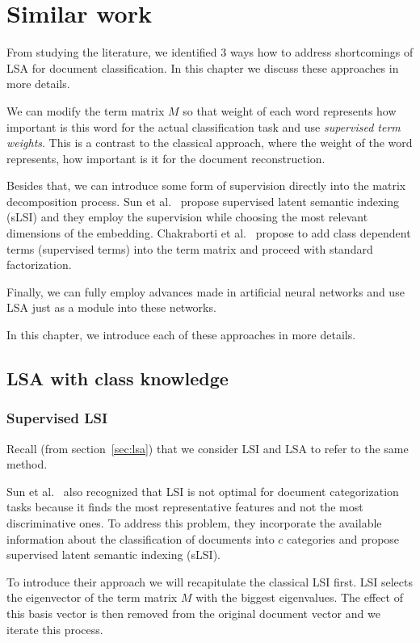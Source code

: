 \chapter{Similar work}
From studying the literature, we identified 3 ways how to address shortcomings of LSA for document classification. In this chapter we discuss these approaches in more details.

We can modify the term matrix $M$ so that weight of each word represents how important is this word for the actual classification task and use \emph{supervised term weights}. 
This is a contrast to the classical approach, where the weight of the word represents, how important is it for the document reconstruction.

Besides that, we can introduce some form of supervision directly into the matrix decomposition process.
Sun et al.~\cite{sun2004supervised} propose supervised latent semantic indexing (sLSI) and they employ the supervision while choosing the most relevant dimensions of the embedding.
Chakraborti et al.~\cite{chakraborti2006sprinkling} propose to add class dependent terms (supervised terms) into the term matrix and proceed with standard factorization.

Finally, we can fully employ advances made in artificial neural networks and use LSA just as a module into these networks.

In this chapter, we introduce each of these approaches in more details.


\section{LSA with class knowledge} \label{sec:superwisedlsa}
    \subsection{Supervised LSI}
        Recall (from section~\ref{sec:lsa}) that we consider LSI and LSA to refer to the same method. 
    
        Sun et al.~\cite{sun2004supervised} %
        also recognized that LSI is not optimal for document categorization tasks because it finds the most representative features and not the most discriminative ones. 
        To address this problem, they incorporate the available information about the classification of documents into $c$ categories and propose supervised latent semantic indexing (sLSI).
        
        To introduce their approach we will recapitulate the classical LSI first. 
        LSI selects the eigenvector of the term matrix $M$ with the biggest eigenvalues.
        The effect of this basis vector is then removed from the original document vector and we iterate this process. 
        
